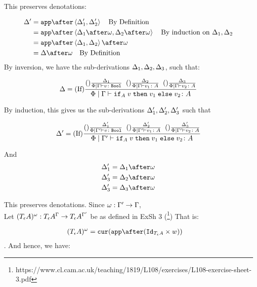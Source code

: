 \documentclass{report}
\begin{document}
        This preserves denotations:

        \begin{align}
            \D' &= \app\after\pr{\D_1'}{\D_2'} \qt{By Definition}\\
            &= \app\after\pr{\D_1\after\w}{\D_2\after\w} \qt{By induction on $\D_1, \D_2$}\\
            &= \app\after\pr{\D_1}{\D_2}\after\w\\
            &= \D\after\w\qt{By Definition}
        \end{align}
    By inversion, we have the sub-derivations $\Delta_1,\Delta_2,\Delta_3$, such that:


    \begin{equation}
        \Delta = (\text{If}) \frac{
            (\text{}) \frac{\Delta_1}{\Phi\mid\Gamma \vdash v \colon \texttt{Bool}}
            \;\;
            (\text{}) \frac{\Delta_2}{\Phi\mid\Gamma \vdash v_1 \colon A}
            \;\;
            (\text{}) \frac{\Delta_3}{\Phi\mid\Gamma \vdash v_2 \colon A}
        }{
            \Phi\mid\Gamma \vdash \texttt{if}_{A}\; v\; \texttt{then}\; v_1 \;\texttt{else} \; v_2 \colon A
        }
    \end{equation}

    By induction, this gives us the sub-derivations $\Delta_1', \Delta_2', \Delta_3'$ such that

    \begin{equation}
        \Delta' = (\text{If}) \frac{
            (\text{}) \frac{\Delta_1'}{\Phi\mid\Gamma' \vdash v \colon \texttt{Bool}}
            \;\;
            (\text{}) \frac{\Delta_2'}{\Phi\mid\Gamma' \vdash v_1 \colon A}
            \;\;
            (\text{}) \frac{\Delta_3'}{\Phi\mid\Gamma' \vdash v_2 \colon A}
        }{
            \Phi\mid\Gamma' \vdash \texttt{if}_{A}\; v\; \texttt{then}\; v_1 \;\texttt{else} \; v_2 \colon A
        }
    \end{equation}

    And 
    \begin{align}
        \D_1' & =\D_1 \after \w\\
        \D_3' & =\D_2 \after \w\\
        \D_3' & =\D_3 \after \w 
    \end{align}


    This preserves denotations.
    Since $\omega: \Gamma' \rightarrow \Gamma$, \\
    Let $(T_{\epsilon}{A})^{\omega}: T_{\epsilon}{A}^{\Gamma}\rightarrow T_{\epsilon}{A}^{\Gamma'}$ be as defined in ExSh 3 (\footnote{https://www.cl.cam.ac.uk/teaching/1819/L108/exercises/L108-exercise-sheet-3.pdf})
    That is:

    \begin{align}
        (\tea)^{\w} & = \cur{\app\after(\Id{\tea}\times w)}
    \end{align}.
    And hence, we have:
\end{document}
